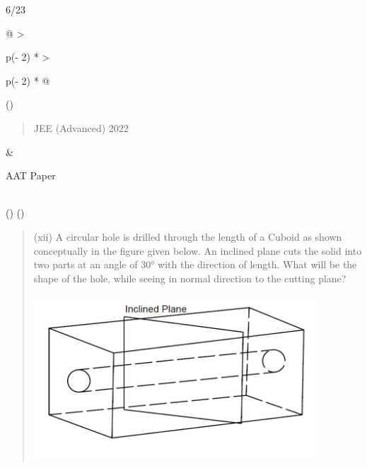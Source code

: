 \documentclass[
]{article}
\begin{document}
6/23

\begin{longtable}[]{@{}
  >{\raggedright\arraybackslash}p{(\columnwidth - 2\tabcolsep) * }
  >{\raggedright\arraybackslash}p{(\columnwidth - 2\tabcolsep) * }@{}}
\toprule()
\begin{minipage}[b]{\linewidth}\raggedright
\begin{quote}
JEE (Advanced) 2022
\end{quote}
\end{minipage} & \begin{minipage}[b]{\linewidth}\raggedright
AAT Paper
\end{minipage} \\
\midrule()
\endhead
\bottomrule()
\end{longtable}

\begin{quote}
(xii) A circular hole is drilled through the length of a Cuboid as shown
conceptually in the figure given below. An inclined plane cuts the solid
into two parts at an angle of 30° with the direction of length. What
will be the shape of the hole, while seeing in normal direction to the
cutting plane?

\includegraphics[width=4.16667in,height=2.41667in]{vertopal_2361032064654423b71b7db67d98c753/media/image8.png}
\end{quote}
\end{document}
